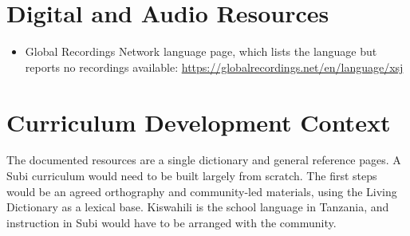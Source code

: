 \documentclass[12pt]{article}
\begin{document}
\section{Digital and Audio Resources}
\begin{itemize}
\item Global Recordings Network language page, which lists the language but reports no recordings available: \url{https://globalrecordings.net/en/language/xsj}
\end{itemize}

\section{Curriculum Development Context}
The documented resources are a single dictionary and general reference pages. A Subi curriculum would need to be built largely from scratch. The first steps would be an agreed orthography and community-led materials, using the Living Dictionary as a lexical base. Kiswahili is the school language in Tanzania, and instruction in Subi would have to be arranged with the community.
\end{document}
